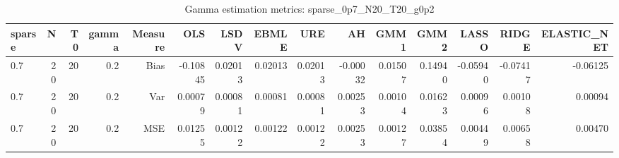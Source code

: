 \begin{table}[!htbp]\centering
\caption{Gamma estimation metrics: sparse_0p7_N20_T20_g0p2}
\label{tab:table1_sparse_0p7_N20_T20_g0p2}
\begin{tabular}{lrrrrrrrrrrrrrr}
\hline
sparse & N & T0 & gamma & Measure & OLS & LSDV & EBMLE & URE & AH & GMM1 & GMM2 & LASSO & RIDGE & ELASTIC_NET \\
\hline
0.7 & 20 & 20 & 0.2 & Bias & -0.10845 & 0.02013 & 0.02013 & 0.02013 & -0.00032 & 0.01507 & 0.14940 & -0.05940 & -0.07417 & -0.06125 \\
0.7 & 20 & 20 & 0.2 & Var & 0.00079 & 0.00081 & 0.00081 & 0.00081 & 0.00253 & 0.00104 & 0.01623 & 0.00096 & 0.00108 & 0.00094 \\
0.7 & 20 & 20 & 0.2 & MSE & 0.01255 & 0.00122 & 0.00122 & 0.00122 & 0.00253 & 0.00127 & 0.03854 & 0.00449 & 0.00658 & 0.00470 \\
\hline
\end{tabular}
\end{table}

